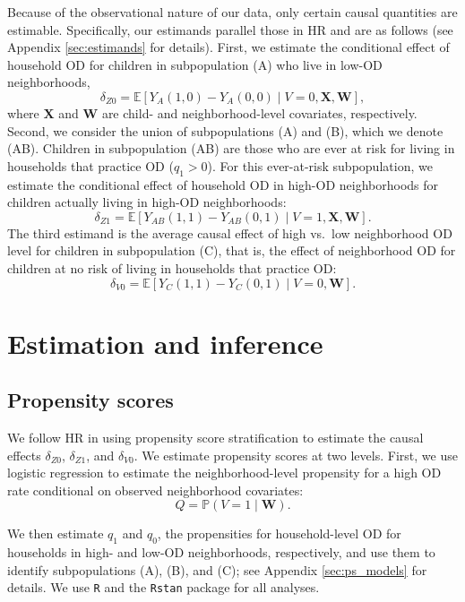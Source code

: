 \documentclass[12pt,a4paper,titlepage]{article}
\begin{document}
Because of the observational nature of our data, only certain causal quantities are estimable. Specifically, our estimands parallel those in HR and are as follows (see Appendix \ref{sec:estimands} for details). First, we estimate the conditional effect of household OD for children in subpopulation (A) who live in low-OD neighborhoods,
\begin{equation}\label{eq:delta_z0}
	\delta_{Z0} = \mathbb{E}[Y_A(1,0) - Y_A(0,0) \mid V=0, \mathbf{X}, \mathbf{W}],
\end{equation}
where $\mathbf{X}$ and $\mathbf{W}$ are child- and neighborhood-level covariates, respectively. Second, we consider the union of subpopulations (A) and (B), which we denote (AB). Children in subpopulation (AB) are those who are ever at risk for living in households that practice OD ($q_1 > 0$). For this ever-at-risk subpopulation, we estimate the conditional effect of household OD in high-OD neighborhoods for children actually living in high-OD neighborhoods:
\begin{equation}\label{eq:delta_z1}
	\delta_{Z1} = \mathbb{E}[Y_{AB}(1,1) - Y_{AB}(0,1) \mid V=1, \mathbf{X}, \mathbf{W}].
\end{equation}
The third estimand is the average causal effect of high vs.\ low neighborhood OD level for children in subpopulation (C), that is, the effect of neighborhood OD for children at no risk of living in households that practice OD:
\begin{equation}\label{eq:delta_v0}
	\delta_{V0} = \mathbb{E}[Y_C(1,1) - Y_C(0,1) \mid V=0, \mathbf{W}].
\end{equation}

\section{Estimation and inference}
\subsection{Propensity scores}
We follow HR in using propensity score stratification to estimate the causal effects $\delta_{Z0}$, $\delta_{Z1}$, and $\delta_{V0}$. We estimate propensity scores at two levels. First, we use logistic regression to estimate the neighborhood-level propensity for a high OD rate conditional on observed neighborhood covariates:
\[
	Q = \mathbb{P}(V=1 \mid \mathbf{W}).
\]

We then estimate $q_1$ and $q_0$, the propensities for household-level OD for households in high- and low-OD neighborhoods, respectively, and use them to identify subpopulations (A), (B), and (C); see Appendix \ref{sec:ps_models} for details. We use \texttt{R} and the \texttt{Rstan} package for all analyses.
\end{document}
